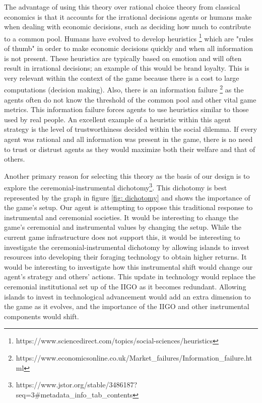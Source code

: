 The advantage of using this theory over rational choice theory from classical economics is that it accounts for the irrational decisions agents or humans make when dealing with economic decisions, such as deciding how much to contribute to a common pool. Humans have evolved to develop heuristics \footnote{https://www.sciencedirect.com/topics/social-sciences/heuristics} which are "rules of thumb" in order to make economic decisions quickly and when all information is not present. These heuristics are typically based on emotion and will often result in irrational decisions; an example of this would be brand loyalty. This is very relevant within the context of the game because there is a cost to large computations (decision making). Also, there is an information failure \footnote{https://www.economicsonline.co.uk/Market_failures/Information_failure.html} as the agents often do not know the threshold of the common pool and other vital game metrics. This information failure forces agents to use heuristics similar to those used by real people. An excellent example of a heuristic within this agent strategy is the level of trustworthiness decided within the social dilemma. If every agent was rational and all information was present in the game, there is no need to trust or distrust agents as they would maximize both their welfare and that of others.

Another primary reason for selecting this theory as the basis of our design is to explore the ceremonial-instrumental dichotomy\footnote{https://www.jstor.org/stable/3486187?seq=3#metadata_info_tab_contents}. This dichotomy is best represented by the graph in figure \ref{fig: dichotomy} and shows the importance of the game's setup. Our agent is attempting to oppose this traditional response to instrumental and ceremonial societies. It would be interesting to change the game's ceremonial and instrumental values by changing the setup. While the current game infrastructure does not support this, it would be interesting to investigate the ceremonial-instrumental dichotomy by allowing islands to invest resources into developing their foraging technology to obtain higher returns. It would be interesting to investigate how this instrumental shift would change our agent's strategy and others' actions. This update in technology would replace the ceremonial institutional set up of the IIGO as it becomes redundant. Allowing islands to invest in technological advancement would add an extra dimension to the game as it evolves, and the importance of the IIGO and other instrumental components would shift.

